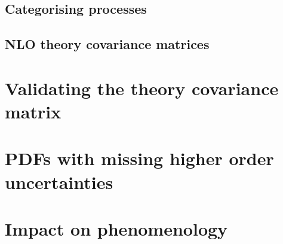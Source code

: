 \subsection{Categorising processes}
\subsection{NLO theory covariance matrices}

\section{Validating the theory covariance matrix}
\label{sec:valid}

\section{PDFs with missing higher order uncertainties}
\label{sec:pdfs}

\section{Impact on phenomenology}
\label{sec:mhoupheno}
